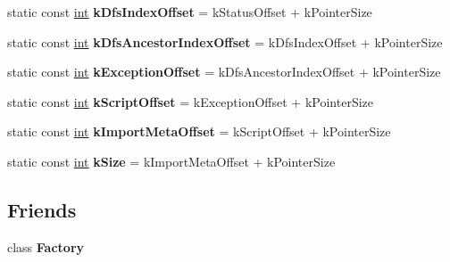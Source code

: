 \begin{DoxyCompactItemize}
\item 
\mbox{\label{classv8_1_1internal_1_1Module_aa94c752dad7af01f0e8a161f496d8824}} 
static const \mbox{\hyperlink{classint}{int}} {\bfseries k\+Dfs\+Index\+Offset} = k\+Status\+Offset + k\+Pointer\+Size
\item 
\mbox{\label{classv8_1_1internal_1_1Module_ac0b2961af426000656963b919c13b41f}} 
static const \mbox{\hyperlink{classint}{int}} {\bfseries k\+Dfs\+Ancestor\+Index\+Offset} = k\+Dfs\+Index\+Offset + k\+Pointer\+Size
\item 
\mbox{\label{classv8_1_1internal_1_1Module_a033daa4cf7f524d0befff8b89598f4b3}} 
static const \mbox{\hyperlink{classint}{int}} {\bfseries k\+Exception\+Offset} = k\+Dfs\+Ancestor\+Index\+Offset + k\+Pointer\+Size
\item 
\mbox{\label{classv8_1_1internal_1_1Module_a579bdbbbcebacd518baee5d9a5d94e17}} 
static const \mbox{\hyperlink{classint}{int}} {\bfseries k\+Script\+Offset} = k\+Exception\+Offset + k\+Pointer\+Size
\item 
\mbox{\label{classv8_1_1internal_1_1Module_a35f196d4de6f05b7cfce2db7528b92fc}} 
static const \mbox{\hyperlink{classint}{int}} {\bfseries k\+Import\+Meta\+Offset} = k\+Script\+Offset + k\+Pointer\+Size
\item 
\mbox{\label{classv8_1_1internal_1_1Module_abcb2dbe1b8fa6fd006f38b44b523e98f}} 
static const \mbox{\hyperlink{classint}{int}} {\bfseries k\+Size} = k\+Import\+Meta\+Offset + k\+Pointer\+Size
\end{DoxyCompactItemize}
\subsection*{Friends}
\begin{DoxyCompactItemize}
\item 
\mbox{\label{classv8_1_1internal_1_1Module_a328c093d609680cca505905c6d49901a}} 
class {\bfseries Factory}
\end{DoxyCompactItemize}


